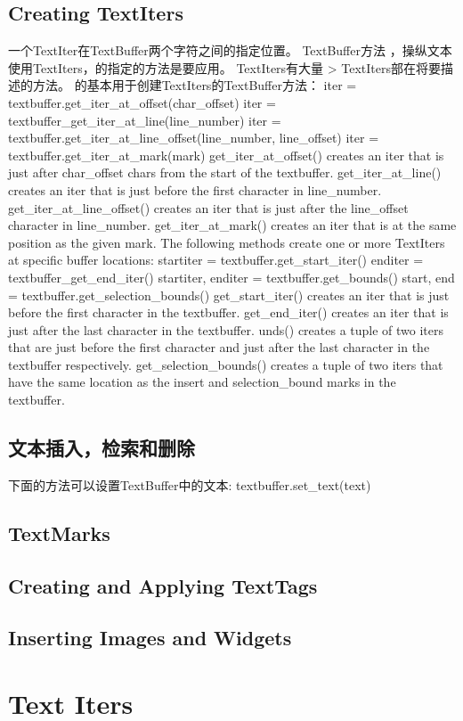 	\subsection{Creating TextIters}
	一个TextIter在TextBuffer两个字符之间的指定位置。 TextBuffer方法
	，操纵文本使用TextIters，的指定的方法是要应用。 TextIters有大量
	> TextIters部在将要描述的方法。
	的基本用于创建TextIters的TextBuffer方法：
	iter = textbuffer.get_iter_at_offset(char_offset)
	iter = textbuffer_get_iter_at_line(line_number)
	iter = textbuffer.get_iter_at_line_offset(line_number, line_offset)
	iter = textbuffer.get_iter_at_mark(mark)
	get_iter_at_offset() creates an iter that is just after char_offset chars from the start of the textbuffer.
	get_iter_at_line() creates an iter that is just before the first character in line_number.
	get_iter_at_line_offset() creates an iter that is just after the line_offset character in line_number.
	get_iter_at_mark() creates an iter that is at the same position as the given mark.
	The following methods create one or more TextIters at specific buffer locations:
	startiter = textbuffer.get_start_iter()
	enditer = textbuffer_get_end_iter()
	startiter, enditer = textbuffer.get_bounds()
	start, end = textbuffer.get_selection_bounds()
	get_start_iter() creates an iter that is just before the first character in the textbuffer.
	get_end_iter() creates an iter that is just after the last character in the textbuffer.
	unds() creates a tuple of two iters that are just before the first character and just after the last character in the
	textbuffer respectively.
	get_selection_bounds() creates a tuple of two iters that have the same location as the insert and
	selection_bound marks in the textbuffer.
	\subsection{文本插入，检索和删除}
	下面的方法可以设置TextBuffer中的文本:
	textbuffer.set_text(text)
	\subsection{TextMarks}
	\subsection{Creating and Applying TextTags}
	\subsection{Inserting Images and Widgets}
\section{Text Iters}
